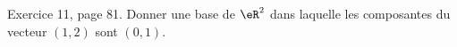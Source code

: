 \begin{exercice}\label{exoLineraire0022}

	Exercice 11, page 81. Donner une base de $\eR^2$ dans laquelle les composantes du vecteur $(1,2)$ sont $(0,1)$.

\end{exercice}
